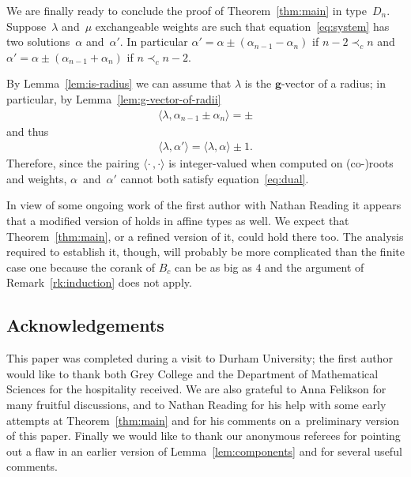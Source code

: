 \documentclass[pdftex]{sigma}
\numberwithin{equation}{section}
\newcommand{\bg}{\mathbf{g}}
\begin{document}
  We are f\/inally ready to conclude the proof of Theorem~\ref{thm:main} in type~$D_n$.
  Suppose~$\lambda$ and~$\mu$ exchangeable weights are such that equation~\eqref{eq:system} has two solutions~$\alpha$ and~$\alpha'$.
  In particular $\alpha' = \alpha \pm (\alpha_{n-1}-\alpha_n)$ if $n-2 \prec_c n$ and $\alpha' = \alpha \pm (\alpha_{n-1}+\alpha_n)$ if $n \prec_c n-2$.

  By Lemma~\ref{lem:is-radius} we can assume that $\lambda$ is the $\bg$-vector of a radius; in particular, by Lemma~\ref{lem:g-vector-of-radii}
  \begin{gather*}
    \langle \lambda, \alpha_{n-1}\pm \alpha_n \rangle = \pm
  \end{gather*}
  and thus
  \begin{gather*}
    \langle \lambda, \alpha' \rangle = \langle \lambda, \alpha \rangle \pm 1.
  \end{gather*}
  Therefore, since the pairing $\langle\cdot\,,\cdot\rangle$ is integer-valued when computed on (co-)roots and weights, $\alpha$~and~$\alpha'$ cannot both satisfy equation~\eqref{eq:dual}.

  \begin{Remark}
    In view of some ongoing work of the f\/irst author with Nathan Reading it appears that a modif\/ied version of \cite[Propositions~5.1 and~5.2]{Ste13} holds in af\/f\/ine types as well.
    We expect that Theorem~\ref{thm:main}, or a ref\/ined version of it, could hold there too.
    The analysis required to establish it, though, will probably be more complicated than the f\/inite case one because the corank of $B_c$ can be as big as $4$ and the argument of Remark~\ref{rk:induction} does not apply.
  \end{Remark}

\subsection*{Acknowledgements}
  This paper was completed during a visit to Durham University; the f\/irst author would like to thank both Grey College and the Department of Mathematical Sciences for the hospitality received.
  We are also grateful to Anna Felikson for many fruitful discussions, and to Nathan Reading for his help with some early attempts at Theorem~\ref{thm:main} and for his comments on a~pre\-li\-mi\-nary version of this paper.
  Finally we would like to thank our anonymous referees for pointing out a f\/law in an earlier version of Lemma~\ref{lem:components} and for several useful comments.
\end{document}
